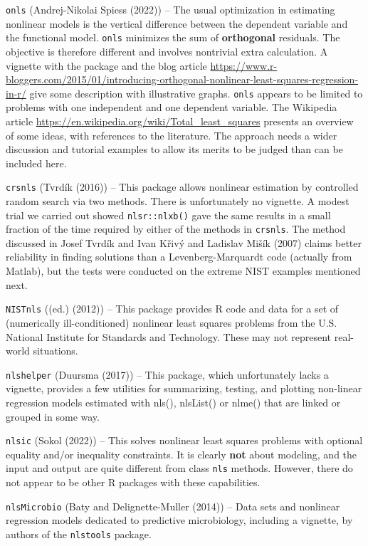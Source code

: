 \texttt{onls} (Andrej-Nikolai Spiess (2022)) -- The usual optimization in estimating nonlinear models
is the vertical difference between the dependent variable and the functional
model. \texttt{onls} minimizes the sum of \textbf{orthogonal} residuals. The objective is
therefore different and involves nontrivial extra calculation. A vignette with
the package and the blog article
\url{https://www.r-bloggers.com/2015/01/introducing-orthogonal-nonlinear-least-squares-regression-in-r/}
give some description with illustrative graphs. \texttt{onls} appears to be limited to
problems with one independent and one dependent variable. The Wikipedia article
\url{https://en.wikipedia.org/wiki/Total_least_squares} presents an overview of some
ideas, with references to the literature. The approach needs a wider
discussion and tutorial examples to allow its merits to be judged than can be
included here.

\texttt{crsnls} (Tvrdík (2016)) -- This package allows nonlinear estimation by
controlled random search via two methods. There is unfortunately no vignette.
A modest trial we carried out showed \texttt{nlsr::nlxb()} gave the same results in
a small fraction of the time required by either of the methods in \texttt{crsnls}. The
method discussed in Josef Tvrdík and Ivan Křivý and Ladislav Mišík (2007) claims better reliability in finding solutions
than a Levenberg-Marquardt code (actually from Matlab), but the tests were conducted
on the extreme NIST examples mentioned next.

\texttt{NISTnls} ((ed.) (2012)) -- This package provides R code and data for a set of
(numerically ill-conditioned) nonlinear least squares problems from the U.S. National
Institute for Standards and Technology. These may not represent real-world situations.

\texttt{nlshelper} (Duursma (2017)) -- This package, which unfortunately lacks a
vignette, provides a few utilities for summarizing, testing, and plotting
non-linear regression models estimated with nls(), nlsList() or nlme() that
are linked or grouped in some way.

\texttt{nlsic} (Sokol (2022)) -- This solves nonlinear least squares problems with optional
equality and/or inequality constraints. It is clearly \textbf{not} about modeling, and
the input and output are quite different from class \texttt{nls} methods. However, there do
not appear to be other R packages with these capabilities.

\texttt{nlsMicrobio} (Baty and Delignette-Muller (2014)) -- Data sets and nonlinear regression models
dedicated to predictive microbiology, including a vignette, by authors of the
\texttt{nlstools} package.

